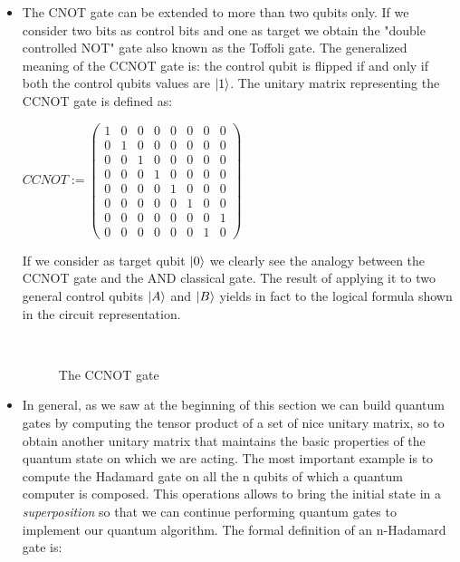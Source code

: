 \documentclass[english]{article}
\begin{document}
\begin{itemize}
				\item The CNOT gate can be extended to more than two qubits only. If we consider two bits as control bits and one as target we obtain the "double controlled NOT" gate also known as the Toffoli gate. The generalized meaning of the CCNOT gate is: the control qubit is flipped if and only if both the control qubits values are $\left\vert{1}\right\rangle$. The unitary matrix representing the CCNOT gate is defined as:
				
				\begin{center}
					$
					CCNOT :=
					\begin{pmatrix}
						1 & 0 & 0 & 0 & 0 & 0 & 0 & 0\\
						0 & 1 & 0 & 0 & 0 & 0 & 0 & 0\\
						0 & 0 & 1 & 0 & 0 & 0 & 0 & 0\\
						0 & 0 & 0 & 1 & 0 & 0 & 0 & 0\\
						0 & 0 & 0 & 0 & 1 & 0 & 0 & 0\\
						0 & 0 & 0 & 0 & 0 & 1 & 0 & 0\\
						0 & 0 & 0 & 0 & 0 & 0 & 0 & 1\\
						0 & 0 & 0 & 0 & 0 & 0 & 1 & 0
					\end{pmatrix}
					$
				\end{center}
			
				If we consider as target qubit $\left\vert{0}\right\rangle$ we clearly see the analogy between the CCNOT gate and the AND classical gate. The result of applying it to two general control qubits $\left\vert{A}\right\rangle$ and $\left\vert{B}\right\rangle$ yields in fact to the logical formula shown in the circuit representation.
				
				\begin{figure}[h]
					\centering
					\mbox{
					}
					\caption{The CCNOT gate}
				\end{figure}
			
				\item In general, as we saw at the beginning of this section we can build quantum gates by computing the tensor product of a set of nice unitary matrix, so to obtain another unitary matrix that maintains the basic properties of the quantum state on which we are acting. The most important example is to compute the Hadamard gate on all the n qubits of which a quantum computer is composed. This operations allows to bring the initial state in a \emph{superposition} so that we can continue performing quantum gates to implement our quantum algorithm. The formal definition of an n-Hadamard gate is:
				

\end{itemize}
\end{document}
